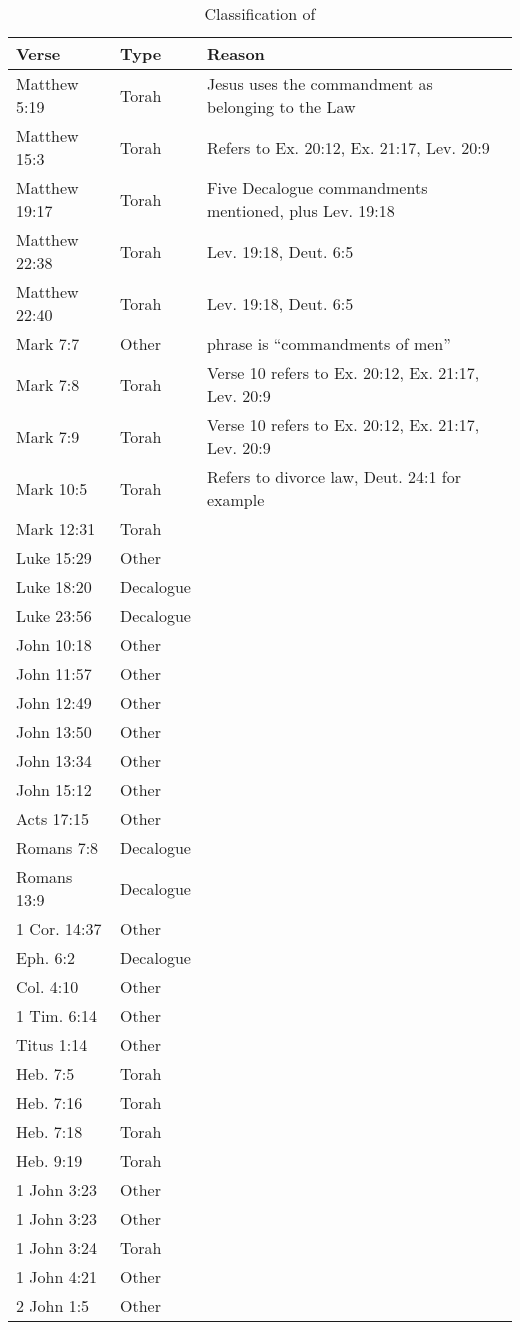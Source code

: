 \documentclass{article}
\newcommand{\entole}{\textepsilon\textnu\texttau\textomikron\textlambda\textepsilon\xspace}
\begin{document}
\begin{table}
    \begin{tabularx}{\textwidth}{llX}
    \toprule
    \textbf{Verse} & \textbf{Type} & \textbf{Reason} \\
    \midrule
    Matthew 5:19 & Torah & Jesus uses the commandment as belonging to the Law \\
    Matthew 15:3 & Torah & Refers to Ex. 20:12, Ex. 21:17, Lev. 20:9 \\
    Matthew 19:17 & Torah & Five Decalogue commandments mentioned, plus Lev. 19:18 \\
    Matthew 22:38 & Torah & Lev. 19:18, Deut. 6:5\\
    Matthew 22:40 & Torah & Lev. 19:18, Deut. 6:5\\
    Mark 7:7 & Other & phrase is ``commandments of men'' \\
    Mark 7:8 & Torah & Verse 10 refers to Ex. 20:12, Ex. 21:17, Lev. 20:9\\
    Mark 7:9 & Torah & Verse 10 refers to Ex. 20:12, Ex. 21:17, Lev. 20:9\\
    Mark 10:5 & Torah & Refers to divorce law, Deut. 24:1 for example\\
    Mark 12:31 & Torah & \\
    Luke 15:29 & Other & \\
    Luke 18:20 & Decalogue & \\
    Luke 23:56 & Decalogue & \\
    John 10:18 & Other & \\
    John 11:57 & Other & \\
    John 12:49 & Other & \\
    John 13:50 & Other & \\
    John 13:34 & Other & \\
    John 15:12 & Other & \\
    Acts 17:15 & Other & \\
    Romans 7:8 & Decalogue & \\
    Romans 13:9 & Decalogue & \\
    1 Cor. 14:37 & Other & \\
    Eph. 6:2 & Decalogue & \\
    Col. 4:10 & Other & \\
    1 Tim. 6:14 & Other & \\
    Titus 1:14 & Other & \\
    Heb. 7:5 & Torah & \\
    Heb. 7:16 & Torah & \\
    Heb. 7:18 & Torah & \\
    Heb. 9:19 & Torah & \\
    1 John 3:23 & Other & \\
    1 John 3:23 & Other & \\
    1 John 3:24 & Torah & \\
    1 John 4:21 & Other & \\
    2 John 1:5 & Other & \\
    \bottomrule
\end{tabularx}
    \caption{Classification of \entole}
    \label{training}
\end{table}
\end{document}

